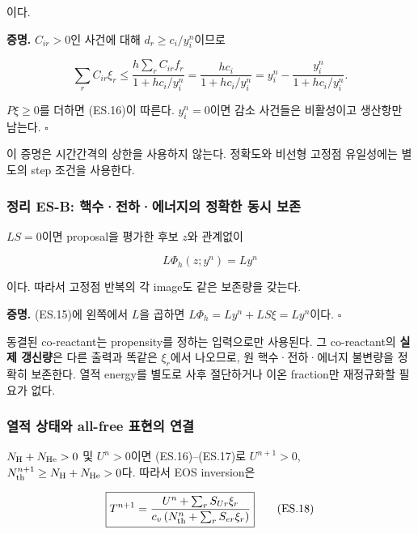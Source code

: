 이다.

\textbf{증명.} \(C_{ir}>0\)인 사건에 대해 \(d_r\ge c_i/y_i^n\)이므로

\[
\sum_r C_{ir}\xi_r
\le
\frac{h\sum_rC_{ir}f_r}{1+h c_i/y_i^n}
=
\frac{h c_i}{1+h c_i/y_i^n}
=
y_i^n-\frac{y_i^n}{1+h c_i/y_i^n}.
\]

\(P\xi\ge0\)를 더하면 (ES.16)이 따른다. \(y_i^n=0\)이면 감소 사건들은 비활성이고 생산항만 남는다. \(\square\)

이 증명은 시간간격의 상한을 사용하지 않는다. 정확도와 비선형 고정점 유일성에는 별도의 step 조건을 사용한다.

\hypertarget{uxc815uxb9ac-es-b-uxd575uxc218uxc804uxd558uxc5d0uxb108uxc9c0uxc758-uxc815uxd655uxd55c-uxb3d9uxc2dc-uxbcf4uxc874}{%
\subsubsection{정리 ES-B: 핵수·전하·에너지의 정확한 동시 보존}\label{uxc815uxb9ac-es-b-uxd575uxc218uxc804uxd558uxc5d0uxb108uxc9c0uxc758-uxc815uxd655uxd55c-uxb3d9uxc2dc-uxbcf4uxc874}}

\(LS=0\)이면 proposal을 평가한 후보 \(z\)와 관계없이

\[
\boxed{
L\Phi_h(z;y^n)=Ly^n
}
\tag{ES.17}
\]

이다. 따라서 고정점 반복의 각 image도 같은 보존량을 갖는다.

\textbf{증명.} (ES.15)에 왼쪽에서 \(L\)을 곱하면 \(L\Phi_h=Ly^n+LS\xi=Ly^n\)이다. \(\square\)

동결된 co-reactant는 propensity를 정하는 입력으로만 사용된다. 그 co-reactant의 \textbf{실제 갱신량}은 다른 출력과 똑같은 \(\xi_r\)에서 나오므로, 원 핵수·전하·에너지 불변량을 정확히 보존한다. 열적 energy를 별도로 사후 절단하거나 이온 fraction만 재정규화할 필요가 없다.

\hypertarget{uxc5f4uxc801-uxc0c1uxd0dcuxc640-all-free-uxd45cuxd604uxc758-uxc5f0uxacb0}{%
\subsubsection{열적 상태와 all-free 표현의 연결}\label{uxc5f4uxc801-uxc0c1uxd0dcuxc640-all-free-uxd45cuxd604uxc758-uxc5f0uxacb0}}

\(N_{\rm H}+N_{\rm He}>0\) 및 \(U^n>0\)이면 (ES.16)--(ES.17)로 \(U^{n+1}>0\), \(N_{\rm th}^{n+1}\ge N_{\rm H}+N_{\rm He}>0\)다. 따라서 EOS inversion은

\[
\boxed{
T^{n+1}=\frac{U^n+\sum_r S_{Ur}\xi_r}
{c_v\left(N_{\rm th}^n+\sum_r S_{er}\xi_r\right)}
}
\tag{ES.18}
\]

